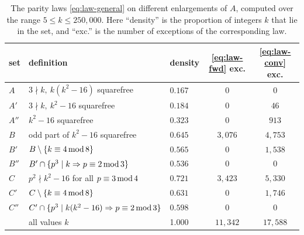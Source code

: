 \documentclass[12pt]{amsart}%
\renewcommand{\pmod}[1]{\hspace{0.05em}(\mathrm{mod}\,#1)}
\newcommand{\1}{\mathds{1}}
\renewcommand{\pmod}[1]{\,{\rm mod}\,#1}
\theoremstyle{definition}
\numberwithin{equation}{section}
\numberwithin{table}{section}
\numberwithin{figure}{section}
\begin{document}
\begin{table}[h]\centering
\renewcommand{\arraystretch}{1.25}
\begin{tabular}{@{}lll cc@{}}
\toprule
set & definition & density & \eqref{eq:law-fwd} exc. & \eqref{eq:law-conv} exc.\\
\midrule
$A$      & $3\nmid k,\ k(k^2-16)$ squarefree      & $0.167$ & $0$ & $0$\\
$A'$     & $3\nmid k,\ k^2-16$ squarefree         & $0.184$ & $0$ & $46$\\
$A''$    & $k^2-16$ squarefree                    & $0.323$ & $0$ & $913$\\
$B$ & odd part of $k^2 - 16$ squarefree & $0.645$ & $3{,}076$ & $4{,}753$\\
$B'$ & $B \setminus \{ k \equiv 4 \pmod 8\}$ & $0.565$ & $0$ & $1{,}538$\\
$B''$ & $B' \cap \{p^3 \mid k\Rightarrow p\equiv 2 \pmod 3 \}$ & $0.536$ & 0 & 0  \\
$C$ & $p^2 \nmid k^2 - 16$ for all $p \equiv 3 \pmod 4$ & $0.721$ & $3{,}423$ &  $5{,}330$ \\
$C'$ & $C \setminus \{ k \equiv 4 \pmod 8 \}$ & $0.631$ & $0$ &  $1{,}746$ \\
$C''$ & $C' \cap  \{p^3 \mid k(k^2 - 16) \Rightarrow p\equiv 2 \pmod 3 \}$ & $0.598$ & $0$ & $0$ \\
 & all values $k$ & 1.000 & $11{,}342$ & $17{,}588$ \\
\bottomrule
\end{tabular}
\caption{The parity laws \eqref{eq:law-general} on different enlargements of $A$, computed over the range $5 \leq k\leq 250{,}000$. Here ``density'' is the proportion of integers $k$ that lie in the set, and ``exc.'' is the number of exceptions of the corresponding law.}
\label{tab:sets}
\end{table}
\end{document}
